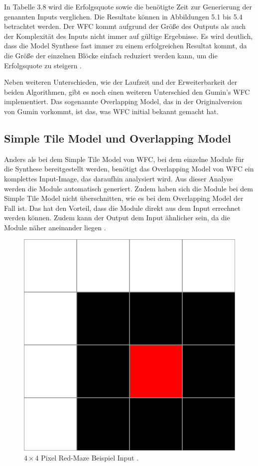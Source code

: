 \documentclass[12pt, a4paper,twoside,openright]{report} %
\begin{document}
In Tabelle 3.8 wird die Erfolgsquote sowie die benötigte Zeit zur Generierung der genannten Inputs verglichen.
Die Resultate können in Abbildungen 5.1 bis 5.4 betrachtet werden.
Der WFC kommt aufgrund der Größe des Outputs als auch der Komplexität des Inputs nicht immer auf gültige Ergebnisse.
Es wird deutlich, dass die Model Synthese fast immer zu einem erfolgreichen Resultat kommt,
da die Größe der einzelnen Blöcke einfach reduziert werden kann, um die Erfolgsquote zu steigern \cite{merrell2018compare}.\par

Neben weiteren Unterschieden, wie der Laufzeit und der Erweiterbarkeit der beiden Algorithmen, gibt es noch einen weiteren Unterschied den Gumin's WFC implementiert.
Das sogenannte Overlapping Model, das in der Originalversion von Gumin vorkommt, ist das, was WFC initial bekannt gemacht hat.

\pagebreak

\subsection{Simple Tile Model und Overlapping Model}

Anders als bei dem Simple Tile Model von WFC, bei dem einzelne Module für die Synthese bereitgestellt werden,
benötigt das Overlapping Model von WFC ein komplettes Input-Image, das daraufhin analysiert wird.
Aus dieser Analyse werden die Module automatisch generiert.
Zudem haben sich die Module bei dem Simple Tile Model nicht überschnitten, wie es bei dem Overlapping Model der Fall ist.
Das hat den Vorteil, dass die Module direkt aus dem Input errechnet werden können.
Zudem kann der Output dem Input ähnlicher sein, da die Module näher aneinander liegen \cite{merrell2018compare}.

\begin{figure}[H]
    \centering
    \includegraphics[width=0.5\linewidth]{images/red-maze.jpg}%
    \caption{$4\times 4$ Pixel Red-Maze Beispiel Input \cite{Karth2017WaveFunctionCollapseIC}.}%
\end{figure}
\end{document}
